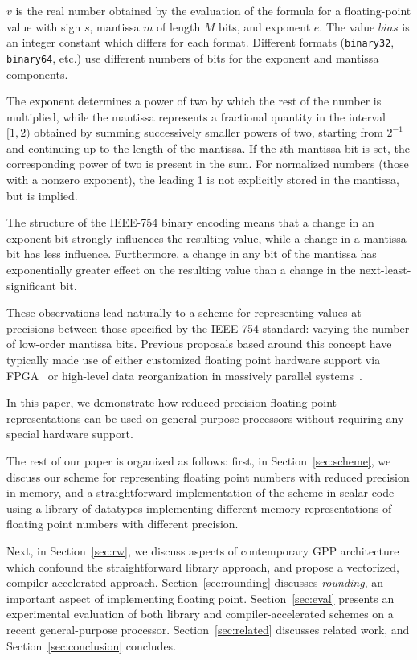 \documentclass{sig-alternate-05-2015}
\newcommand{\mt}[1]{\texttt{#1}}
\begin{document}
\noindent $v$ is the real number obtained by the evaluation of the formula for
a floating-point value with sign $s$, mantissa $m$ of length $M$ bits, and
exponent $e$. The value $bias$ is an integer constant which differs for each
format. Different formats (\mt{binary32}, \mt{binary64}, etc.) use different
numbers of bits for the exponent and mantissa components.

The exponent determines a power of two by which the rest of the number is
multiplied, while the mantissa represents a fractional quantity in the interval
$[1,2)$ obtained by summing successively smaller powers of two, starting from
$2^{-1}$ and continuing up to the length of the mantissa. If the $i$th mantissa
bit is set, the corresponding power of two is present in the sum. For
normalized numbers (those with a nonzero exponent), the leading 1 is not
explicitly stored in the mantissa, but is implied.

The structure of the IEEE-754 binary encoding means that a change in an
exponent bit strongly influences the resulting value, while a change in a
mantissa bit has less influence. Furthermore, a change in any bit of the
mantissa has exponentially greater effect on the resulting value than a change
in the next-least-significant bit.

These observations lead naturally to a scheme for representing values at
precisions between those specified by the IEEE-754 standard: varying the number
of low-order mantissa bits. Previous proposals based around this concept have
typically made use of either customized floating point hardware support via
FPGA~\cite{de2009generating} or high-level data reorganization in massively
parallel systems~\cite{jenkins2012byte}.

In this paper, we demonstrate how reduced precision floating point
representations can be used on general-purpose processors without requiring any
special hardware support.

The rest of our paper is organized as follows: first, in
Section~\ref{sec:scheme}, we discuss our scheme for representing floating point
numbers with reduced precision in memory, and a straightforward implementation
of the scheme in scalar code using a library of datatypes implementing
different memory representations of floating point numbers with different
precision.

Next, in Section~\ref{sec:rw}, we discuss aspects of contemporary GPP
architecture which confound the straightforward library approach, and propose a
vectorized, compiler-accelerated approach. Section~\ref{sec:rounding} discusses
\emph{rounding}, an important aspect of implementing floating point.
Section~\ref{sec:eval} presents an experimental evaluation of both library and
compiler-accelerated schemes on a recent general-purpose processor.
Section~\ref{sec:related} discusses related work, and
Section~\ref{sec:conclusion} concludes.
\end{document}
